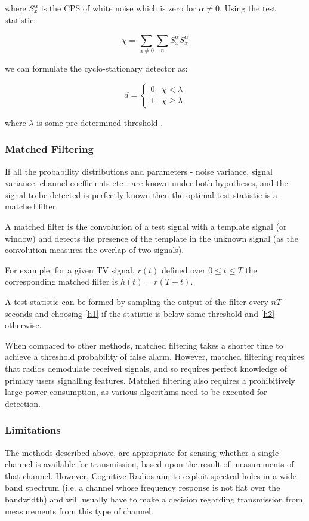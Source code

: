 \documentclass[conference]{IEEEtran}
\newcommand*\conjugate[1]{\bar{#1}}
\begin{document}
where \(S_{x}^{\alpha}\) is the CPS of white noise which is zero for \(\alpha \neq 0 \).  Using the test statistic:

\begin{equation}
\chi = \sum_{\alpha \neq 0} \sum_{n} S_{x}^{\alpha} \conjugate{S_{x}^{\alpha}}
\end{equation}

we can formulate the cyclo-stationary detector as:

\begin{equation}
 d =
  \begin{cases}
   0 & \chi < \lambda  \\
   1 & \chi \geq \lambda
  \end{cases}
\end{equation}

where \(\lambda\) is some pre-determined threshold \cite{Ghozzi2006}. 

\subsubsection{Matched Filtering}
If all the probability distributions and parameters  - noise variance, signal variance, channel coefficients etc - are known under both hypotheses, and the signal to be detected is perfectly known then the optimal test statistic is a matched filter.

A matched filter is the convolution of a test signal with a template signal (or window) and detects the presence of the template in the unknown signal (as the convolution measures the overlap of two signals).

For example: for a given TV signal, \(r\left(t\right)\) defined over \(0 \leq t \leq T\) the corresponding matched filter is \(h\left(t\right) = r\left(T - t\right)\). 

A test statistic can be formed by sampling the output of the filter every \(nT\) seconds and choosing \ref{h1} if the statistic is below some threshold and \ref{h2} otherwise.

When compared to other methods, matched filtering takes a shorter time to achieve a threshold probability of false alarm. However, matched filtering requires that radios demodulate received signals, and so requires perfect knowledge of primary users signalling features. Matched filtering also requires a prohibitively large power consumption, as various algorithms need to be executed for detection.

\subsubsection{Limitations}
The methods described above, are appropriate for sensing whether a single channel is available for transmission, based upon the result of measurements of that channel. However, Cognitive Radios aim to exploit spectral holes in a wide band spectrum (i.e. a channel whose frequency response is not flat over the bandwidth) and will usually have to make a decision regarding transmission from measurements from this type of channel.
\end{document}
